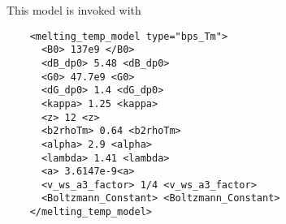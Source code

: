   This model is invoked with
  \begin{lstlisting}
    <melting_temp_model type="bps_Tm">
      <B0> 137e9 </B0>
      <dB_dp0> 5.48 <dB_dp0>
      <G0> 47.7e9 <G0>
      <dG_dp0> 1.4 <dG_dp0>
      <kappa> 1.25 <kappa>
      <z> 12 <z>
      <b2rhoTm> 0.64 <b2rhoTm>
      <alpha> 2.9 <alpha>
      <lambda> 1.41 <lambda>
      <a> 3.6147e-9<a>
      <v_ws_a3_factor> 1/4 <v_ws_a3_factor>
      <Boltzmann_Constant> <Boltzmann_Constant>
    </melting_temp_model>
  \end{lstlisting}
